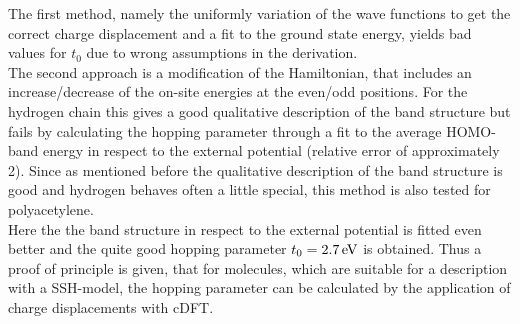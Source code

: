 The first method, namely the uniformly variation of the wave functions to get the correct charge displacement and a fit to the ground state energy, yields bad values for $t_0$ due to wrong assumptions in the derivation.\\
The second approach is a modification of the Hamiltonian, that includes an increase/decrease of the on-site energies at the even/odd positions. For the hydrogen chain this gives a good qualitative description of the band structure but fails by calculating the hopping parameter through a fit to the average HOMO-band energy in respect to the external potential (relative error of approximately 2). Since as mentioned before the qualitative description of the band structure is good and hydrogen behaves often a little special, this method is also tested for polyacetylene.\\
Here the the band structure in respect to the external potential is fitted even better and the quite good hopping parameter $t_0 = \unit[2.7]{eV}$ is obtained. Thus a proof of principle is given, that for molecules, which are suitable for a description with a SSH-model, the hopping parameter can be calculated by the application of charge displacements with cDFT.